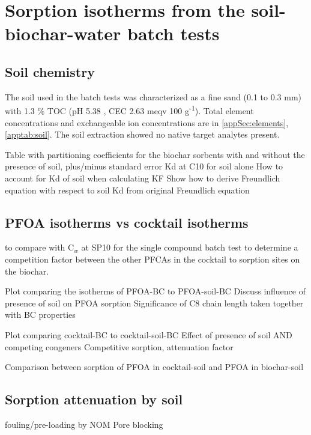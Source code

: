 
\section{Sorption isotherms from the soil-biochar-water batch tests}
\subsection{Soil chemistry}
The soil used in the batch tests was characterized as a fine sand (0.1 to 0.3 mm) with 1.3 \% TOC (pH 5.38 , CEC 2.63  meqv 100 g\textsuperscript{-1}). Total element concentrations and exchangeable ion concentrations are in \cref{appSec:elements}, \cref{apptab:soil}. The soil extraction showed no native target analytes present.  

Table with partitioning coefficients for the biochar sorbents with and without the presence of soil, plus/minus standard error
Kd at C10 for soil alone
How to account for Kd of soil when calculating KF 
    Show how to derive Freundlich equation with respect to soil Kd from original Freundlich equation
    
\subsection{PFOA isotherms vs cocktail isotherms}
to compare with C$_w$ at SP10 for the single compound batch test to determine a competition factor between the other PFCAs in the cocktail to sorption sites on the biochar.

Plot comparing the isotherms of PFOA-BC to PFOA-soil-BC
Discuss influence of presence of soil on PFOA sorption
Significance of C8 chain length taken together with BC properties 

Plot comparing cocktail-BC to cocktail-soil-BC
Effect of presence of soil AND competing congeners
Competitive sorption, attenuation factor

Comparison between sorption of PFOA in cocktail-soil and PFOA in biochar-soil

\subsection{Sorption attenuation by soil}
fouling/pre-loading by NOM
Pore blocking


